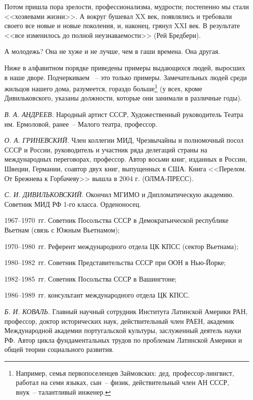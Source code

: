 Потом пришла пора зрелости, профессионализма, мудрости; постепенно мы стали <<хозяевами жизни>>. А вокруг бушевал XX век, появлялись и требовали своего все новые и новые поколения, и, наконец, грянул XXI век. В результате <<все изменилось до полной неузнаваемости>> (Рей Бредбери).

А молодежь? Она не хуже и не лучше, чем в гаши времена. Она другая.

\newpage


Ниже в алфавитном порядке приведены примеры выдающихся людей, выросших в наше дворе. Подчеркиваем ~-- это только примеры. Замечательных людей среди жильцов нашего дома, разумеется, гораздо больше\footnote{Например, семья первопоселенцев Займовских: дед, профессор-лингвист, работал на семи языках, сын~-- физик, действительный член АН СССР, внук~-- талантливый инженер.} (у всех, кроме Дивильковского, указаны должности, которые они занимали в различные годы).

\textit{В. А. АНДРЕЕВ.} Народный артист СССР, Художественный руководитель Театра им. Ермоловой, ранее~-- Малого театра, профессор.

\textit{О. А. ГРИНЕВСКИЙ.} Член коллегии МИД, Чрезвычайны и полномочный посол СССР и России, руководитель и участник ряда делегаций страны на международных переговорах, профессор. Автор восьми книг, изданных в России, Швеции, Германии, соавтор двух книг, выпущенных в США. Книга <<Перелом. От Брежнева к Горбачеву>> вышла в 2004 г. (ОЛМА-ПРЕСС).

\textit{С. И. ДИВИЛЬКОВСКИЙ.} Окончил МГИМО и Дипломатическую академию. Советник МИД РФ 1-го класса. Орденоносец.

1967--1970~гг. Советник Посольства СССР в Демократьической республике Вьетнам (связь с Южным Вьетнамом);

1970--1980~гг. Референт международного отдела ЦК КПСС (сектор Вьетнама);

1980--1982~гг. Советник  Представительства СССР при ООН в Нью-Йорке;

1982--1985~гг. Советник Посольства СССР в Вашингтоне;

1986--1989~гг. консультант международного отдела ЦК КПСС.

\textit{Б. И. КОВАЛЬ.} Главный научный сотрудник Института Латинской Америки РАН, профессор, доктор исторических наук, действительный член РАЕН, академик Международной академии португальской культуры, заслуженный деятель науки РФ. Автор цикла фундаментальных трудов по проблемам Латинской Америки и общей теории социального развития.

